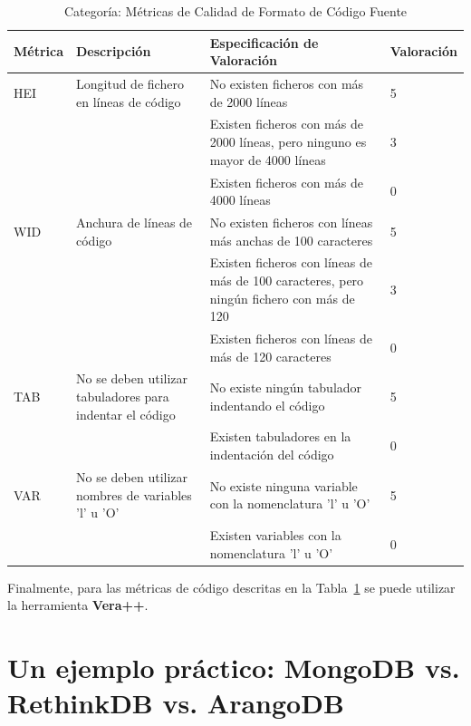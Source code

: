 \documentclass[11pt]{article}
\begin{document}
\begin{table}[H]
  \begin{center}
    \begin{tabular}{ | p{1.6cm} | p{3cm} | p{8cm} | p{2cm} | }
    \toprule
    \textbf{Métrica} & \textbf{Descripción} & \textbf{Especificación de Valoración} & \textbf{Valoración} \\
    \hline
    HEI & Longitud de fichero en líneas de código & No existen ficheros con más de 2000 líneas & 5 \\ \cline{3-3} \cline{4-4}
    & & Existen ficheros con más de 2000 líneas, pero ninguno es mayor de 4000 líneas & 3 \\ \cline{3-3}\cline{4-4}
    & & Existen ficheros con más de 4000 líneas & 0 \\ \cline{3-3}\cline{4-4}
    \hline
    WID & Anchura de líneas de código & No existen ficheros con líneas más anchas de 100 caracteres & 5 \\ \cline{3-3} \cline{4-4} 
    & & Existen ficheros con líneas de más de 100 caracteres, pero ningún fichero con más de 120 & 3 \\ \cline{3-3}\cline{4-4}
    & & Existen ficheros con líneas de más de 120 caracteres & 0 \\ \cline{3-3}\cline{4-4}
    \hline
    TAB & No se deben utilizar tabuladores para indentar el código & No existe ningún tabulador indentando el código & 5 \\ \cline{3-3} \cline{4-4} 
    & & Existen tabuladores en la indentación del código & 0 \\ \cline{3-3} \cline{4-4}
    \hline
    VAR & No se deben utilizar nombres de variables 'l' u 'O' & No existe ninguna variable con la nomenclatura 'l' u 'O' & 5 \\ \cline{3-3} \cline{4-4} 
    & & Existen variables con la nomenclatura 'l' u 'O' & 0 \\ 
    \bottomrule
    \end{tabular}
    \caption{Categoría: Métricas de Calidad de Formato de Código Fuente}
    \label{tab:metrics_format}
  \end{center}
\end{table}

Finalmente, para las métricas de código descritas en la Tabla~\ref{tab:metrics_format} se puede utilizar la herramienta \textbf{Vera++}.

\section{Un ejemplo práctico: MongoDB vs. RethinkDB vs. ArangoDB}
\label{sec:quality_comparison}
\end{document}
